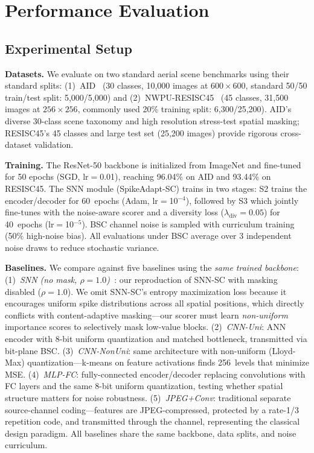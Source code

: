 \documentclass[conference]{IEEEtran}
\begin{document}
\section{Performance Evaluation}
\label{sec:eval}

\subsection{Experimental Setup}

\textbf{Datasets.} We evaluate on two standard aerial scene benchmarks using their standard splits: (1)~AID~\cite{xia2017aid} (30 classes, 10,000 images at $600{\times}600$, standard 50/50 train/test split: 5,000/5,000) and (2)~NWPU-RESISC45~\cite{cheng2017resisc} (45 classes, 31,500 images at $256{\times}256$, commonly used 20\% training split: 6,300/25,200). AID's diverse 30-class scene taxonomy and high resolution stress-test spatial masking; RESISC45's 45 classes and large test set (25,200 images) provide rigorous cross-dataset validation.

\textbf{Training.} The ResNet-50 backbone is initialized from ImageNet and fine-tuned for 50 epochs (SGD, lr$=$0.01), reaching 96.04\% on AID and 93.44\% on RESISC45. The SNN module (SpikeAdapt-SC) trains in two stages: S2 trains the encoder/decoder for 60~epochs (Adam, lr$=$10$^{-4}$), followed by S3 which jointly fine-tunes with the noise-aware scorer and a diversity loss ($\lambda_{\text{div}}{=}0.05$) for 40~epochs (lr$=$10$^{-5}$). BSC channel noise is sampled with curriculum training (50\% high-noise bias). All evaluations under BSC average over 3 independent noise draws to reduce stochastic variance.

\textbf{Baselines.} We compare against five baselines using the \emph{same trained backbone}: (1)~\emph{SNN (no mask, $\rho{=}1.0$)~\cite{wang2024snnsc}}: our reproduction of SNN-SC with masking disabled ($\rho{=}1.0$). We omit SNN-SC's entropy maximization loss because it encourages uniform spike distributions across all spatial positions, which directly conflicts with content-adaptive masking---our scorer must learn \emph{non-uniform} importance scores to selectively mask low-value blocks. (2)~\emph{CNN-Uni}: ANN encoder with 8-bit uniform quantization and matched bottleneck, transmitted via bit-plane BSC. (3)~\emph{CNN-NonUni}: same architecture with non-uniform (Lloyd-Max) quantization---k-means on feature activations finds 256~levels that minimize MSE. (4)~\emph{MLP-FC}: fully-connected encoder/decoder replacing convolutions with FC layers and the same 8-bit uniform quantization, testing whether spatial structure matters for noise robustness. (5)~\emph{JPEG+Conv}: traditional separate source-channel coding---features are JPEG-compressed, protected by a rate-1/3 repetition code, and transmitted through the channel, representing the classical design paradigm. All baselines share the same backbone, data splits, and noise curriculum.
\end{document}
